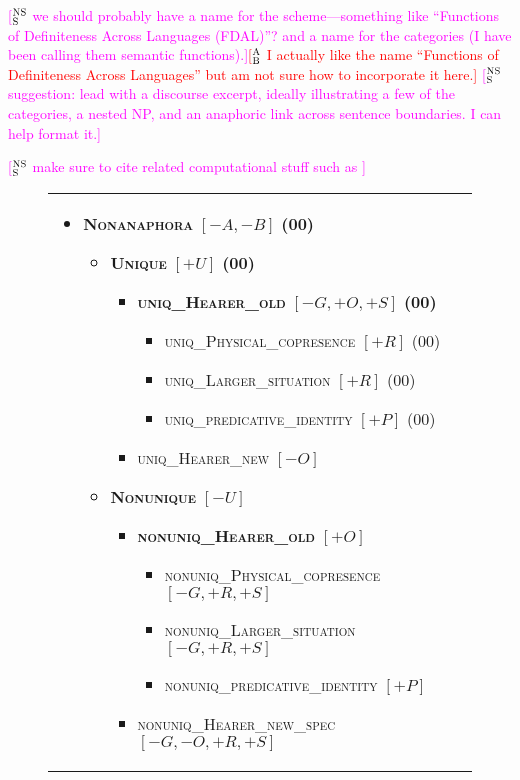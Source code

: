 \documentclass[11pt,letterpaper]{article}
\newcommand{\ensuretext}[1]{#1}
\newcommand{\nssmarker}{\ensuretext{\textcolor{magenta}{\ensuremath{^{\textsc{NS}}_{\textsc{S}}}}}}
\newcommand{\abmarker}{\ensuretext{\textcolor{red}{\ensuremath{^{\textsc{A}}_{\textsc{B}}}}}}
\newcommand{\arkcomment}[3]{\ensuretext{\textcolor{#3}{[#1 #2]}}}
\newcommand{\nss}[1]{\arkcomment{\nssmarker}{#1}{magenta}}
\newcommand{\ab}[1]{\arkcomment{\abmarker}{#1}{red}}
\newcommand{\ilbl}[1]{\mbox{\textbf{\textsc{#1}}}} %
\newcommand{\llbl}[1]{\mbox{\textsc{#1}}} %
\begin{document}
 
\nss{we should probably have a name for the scheme---something like ``Functions of Definiteness Across Languages (FDAL)''? and a name for the categories (I have been calling them semantic functions).}\ab{I actually like the name ``Functions of Definiteness Across Languages'' but am not sure how to incorporate it here.}
\nss{suggestion: lead with a discourse excerpt, ideally illustrating a few of the categories, a nested NP, and 
an anaphoric link across sentence boundaries. I can help format it.}

\nss{make sure to cite related computational stuff such as \citep{reiter10}}

\begin{figure*}\small
\begin{tabular}{p{}p{}}
\begin{itemize}
\item    \ilbl{Nonanaphora} $[-A,-B]$ \textbf{(00)}
  \begin{itemize}
  \item      \ilbl{Unique} $[+U]$ \textbf{(00)}
    \begin{itemize}
    \item        \ilbl{uniq\_Hearer\_old} $[-G,+O,+S]$ \textbf{(00)}
      \begin{itemize}
      \item          \llbl{uniq\_Physical\_copresence} $[+R]$ (00)
      \item          \llbl{uniq\_Larger\_situation} $[+R]$ (00)
      \item          \llbl{uniq\_predicative\_identity} $[+P]$ (00)
      \end{itemize}
    \item        \llbl{uniq\_Hearer\_new} $[-O]$
    \end{itemize}
   \item     \ilbl{Nonunique} $[-U]$
     \begin{itemize}
     \item       \ilbl{nonuniq\_Hearer\_old} $[+O]$
       \begin{itemize}
       \item         \llbl{nonuniq\_Physical\_copresence} $[-G,+R,+S]$
       \item         \llbl{nonuniq\_Larger\_situation} $[-G,+R,+S]$
       \item         \llbl{nonuniq\_predicative\_identity} $[+P]$
       \end{itemize}
     \item       \llbl{nonuniq\_Hearer\_new\_spec} $[-G,-O,+R,+S]$

\end{itemize}
\end{itemize}
\end{itemize}
\end{tabular}
\end{figure*}
\end{document}
